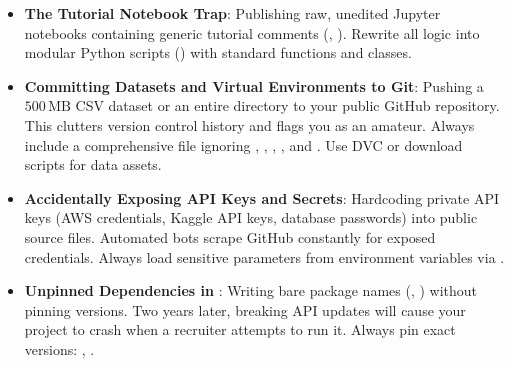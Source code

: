 \begin{warning}
\begin{itemize}
    \item \textbf{The Tutorial Notebook Trap}:
    Publishing raw, unedited Jupyter notebooks containing generic tutorial comments (, ). Rewrite all logic into modular Python scripts () with standard functions and classes.
    \item \textbf{Committing Datasets and Virtual Environments to Git}:
    Pushing a $500\,\text{MB}$ CSV dataset or an entire  directory to your public GitHub repository. This clutters version control history and flags you as an amateur. Always include a comprehensive  file ignoring , , , , and . Use DVC or download scripts for data assets.
    \item \textbf{Accidentally Exposing API Keys and Secrets}:
    Hardcoding private API keys (AWS credentials, Kaggle API keys, database passwords) into public source files. Automated bots scrape GitHub constantly for exposed credentials. Always load sensitive parameters from environment variables via .
    \item \textbf{Unpinned Dependencies in }:
    Writing bare package names (, ) without pinning versions. Two years later, breaking API updates will cause your project to crash when a recruiter attempts to run it. Always pin exact versions: , .
\end{itemize}
\end{warning}

